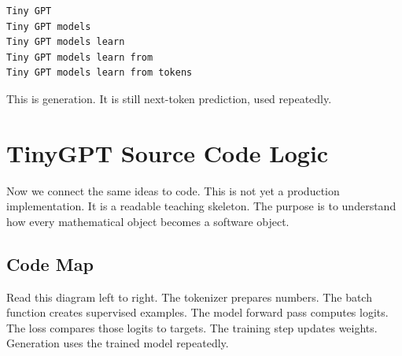\begin{lstlisting}
Tiny GPT
Tiny GPT models
Tiny GPT models learn
Tiny GPT models learn from
Tiny GPT models learn from tokens
\end{lstlisting}

This is generation. It is still next-token prediction, used repeatedly.

\section{TinyGPT Source Code Logic}

Now we connect the same ideas to code. This is not yet a production implementation. It is a readable teaching skeleton. The purpose is to understand how every mathematical object becomes a software object.

\subsection{Code Map}

\begin{center}
\end{center}

Read this diagram left to right. The tokenizer prepares numbers. The batch function creates supervised examples. The model forward pass computes logits. The loss compares those logits to targets. The training step updates weights. Generation uses the trained model repeatedly.

